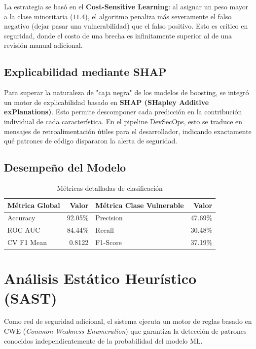 \documentclass[11pt,a4paper]{article}
\begin{document}
La estrategia se basó en el \textbf{Cost-Sensitive Learning}: al asignar un peso mayor a la clase minoritaria ($11.4$), el algoritmo penaliza más severamente el falso negativo (dejar pasar una vulnerabilidad) que el falso positivo. Esto es crítico en seguridad, donde el costo de una brecha es infinitamente superior al de una revisión manual adicional.

\subsection{Explicabilidad mediante SHAP}
Para superar la naturaleza de "caja negra" de los modelos de boosting, se integró un motor de explicabilidad basado en \textbf{SHAP (SHapley Additive exPlanations)}. Esto permite descomponer cada predicción en la contribución individual de cada característica. En el pipeline DevSecOps, esto se traduce en mensajes de retroalimentación útiles para el desarrollador, indicando exactamente qué patrones de código dispararon la alerta de seguridad.

\subsection{Desempeño del Modelo}
\begin{table}[H]
\centering
\caption{Métricas detalladas de clasificación}
\begin{tabular}{lr|lr}
\toprule
\textbf{Métrica Global} & \textbf{Valor} & \textbf{Métrica Clase Vulnerable} & \textbf{Valor} \\
\midrule
Accuracy & 92.05\% & Precision & 47.69\% \\
ROC AUC  & 84.44\% & Recall    & 30.48\% \\
CV F1 Mean & 0.8122 & F1-Score & 37.19\% \\
\bottomrule
\end{tabular}
\end{table}

\section{Análisis Estático Heurístico (SAST)}
Como red de seguridad adicional, el sistema ejecuta un motor de reglas basado en CWE (\textit{Common Weakness Enumeration}) que garantiza la detección de patrones conocidos independientemente de la probabilidad del modelo ML.
\end{document}
